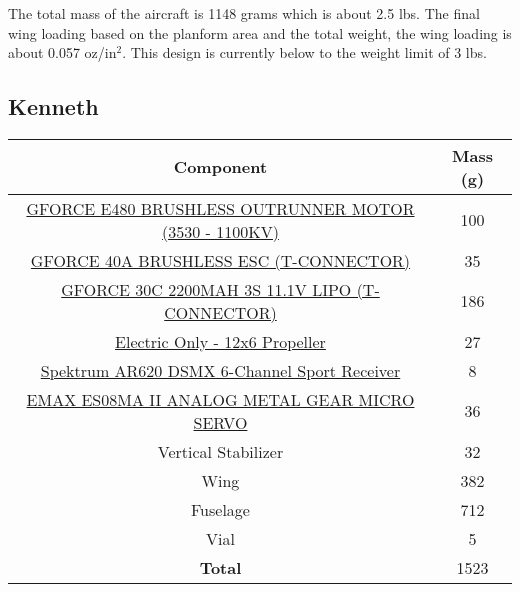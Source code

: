         The total mass of the aircraft is 1148 grams which is about 2.5 lbs. The final wing loading based on the planform area and the total weight, the wing loading is about 0.057 oz/in$^2$. This design is currently below to the weight limit of 3 lbs. 
    \subsection{Kenneth}
        
        \begin{table}[H]
        \begin{tabular}{|c|c| } %
            \hline \textbf{Component} & \textbf{Mass (g)} \\ \hline %
            \href{https://www.amazon.com/Brushless-Outrunner-Multicopters-Helicopter-Control/dp/B08MKQFSVF/ref=asc_df_B08MKQFSVF/?tag=hyprod-20&linkCode=df0&hvadid=475795164185&hvpos=&hvnetw=g&hvrand=9902342740412303481&hvpone=&hvptwo=&hvqmt=&hvdev=c&hvdvcmdl=&hvlocint=&hvlocphy=2840&hvtargid=pla-1195392311214&th=1}{GFORCE E480 BRUSHLESS OUTRUNNER MOTOR (3530 - 1100KV)} & 100 \\ \hline
            \href{http://www.valuehobby.com/gforce-40a-esc.html}{GFORCE 40A BRUSHLESS ESC (T-CONNECTOR)} & 35 \\ \hline
            \href{http://www.valuehobby.com/30c-2200mah-3s-t.html}{GFORCE 30C 2200MAH 3S 11.1V LIPO (T-CONNECTOR)} & 186 \\ \hline
            \href{https://www.masterairscrew.com/products/electric-only-12x6-propeller?currency=USD&utm_medium=cpc&utm_source=google&utm_campaign=Google\%20Shopping&gclid=CjwKCAiA9aKQBhBREiwAyGP5laqPgb8z2BGon5sD8qHYRZQVab7IcA0DZg8DOcFMsDTccBgRqirzgBoC1wkQAvD_BwE}{Electric Only - 12x6 Propeller} & 27 \\ \hline
            \href{https://www.horizonhobby.com/product/ar620-dsmx-6-channel-sport-receiver/SPMAR620.html?gclid=CjwKCAiA9aKQBhBREiwAyGP5lX6-hyQKl87DI0WH0pgWG2HS0woZKcd-L2bMRS_qWmVI1fLqpeCX0BoCrRAQAvD_BwE}{Spektrum AR620 DSMX 6-Channel Sport Receiver} & 8 \\ \hline
            \href{https://arrishobby.com/emax-es08ma-ii-12g-mini-metal-gear-analog-servo-p0842.html?VariantsId=12700}{EMAX ES08MA II ANALOG METAL GEAR MICRO SERVO} & 36 \\ \hline
            Vertical Stabilizer  & 32 \\ \hline
            Wing & 382 \\ \hline
            Fuselage & 712 \\ \hline
            Vial & 5 \\ \hline
            \textbf{Total} & 1523 \\ \hline
        \end{tabular}
        \end{table}
        
